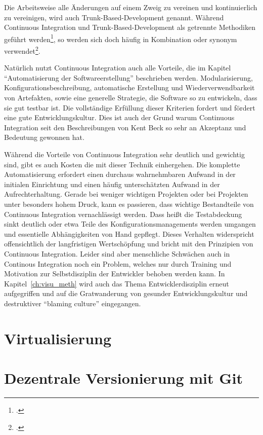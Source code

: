 Die Arbeitsweise alle Änderungen auf einem Zweig zu vereinen und kontinuierlich zu vereinigen, wird auch Trunk-Based-Development genannt. Während Continuous Integration und Trunk-Based-Development als getrennte Methodiken geführt werden\footcite{trunkbaseddevelopment}, so werden sich doch häufig in Kombination oder synonym verwendet\footcite{fowler-feature-branch}.

Natürlich nutzt Continuous Integration auch alle Vorteile, die im Kapitel ``Automatisierung der Softwareerstellung'' beschrieben werden. Modularisierung, Konfigurationsbeschreibung, automatische Erstellung und Wiederverwendbarkeit von Artefakten, sowie eine generelle Strategie, die Software so zu entwickeln, dass sie gut testbar ist. Die vollständige Erfüllung dieser Kriterien fordert und fördert eine gute Entwicklungskultur. Dies ist auch der Grund warum Continuous Integration seit den Beschreibungen von Kent Beck so sehr an Akzeptanz und Bedeutung gewonnen hat.

Während die Vorteile von Continuous Integration sehr deutlich und gewichtig sind, gibt es auch Kosten die mit dieser Technik einhergehen. Die komplette Automatisierung erfordert einen durchaus wahrnehmbaren Aufwand in der initialen Einrichtung und einen häufig unterschätzten Aufwand in der Aufrechterhaltung. Gerade bei weniger wichtigen Projekten oder bei Projekten unter besonders hohem Druck, kann es passieren, dass wichtige Bestandteile von Continuous Integration vernachlässigt werden. Dass heißt die Testabdeckung sinkt deutlich oder etwa Teile des Konfigurationsmanagements werden umgangen und essentielle Abhängigkeiten von Hand gepflegt. Dieses Verhalten widerspricht offensichtlich der langfristigen Wertschöpfung und bricht mit den Prinzipien von Continuous Integration. Leider sind aber menschliche Schwächen auch in Continous Integration noch ein Problem, welches nur durch Training und Motivation zur Selbstdisziplin der Entwickler behoben werden kann. In Kapitel~\ref{ch:visu_meth} wird auch das Thema Entwicklerdisziplin erneut aufgegriffen und auf die Gratwanderung von gesunder Entwicklungskultur und destruktiver ``blaming culture'' eingegangen.

\section{Virtualisierung}



\section{Dezentrale Versionierung mit Git}


